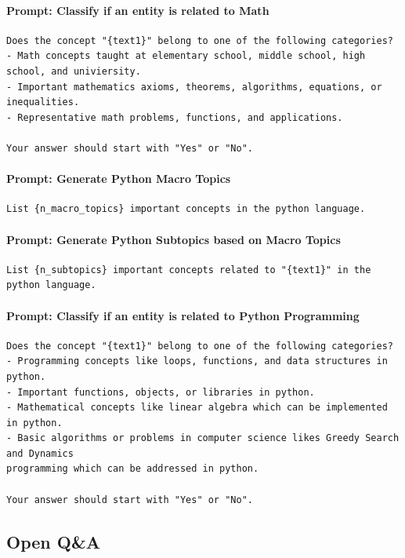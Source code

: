 \documentclass[11pt]{article}
\begin{document}
\paragraph{Prompt: Classify if an entity is related to Math}
\begin{verbatim}
Does the concept "{text1}" belong to one of the following categories?
- Math concepts taught at elementary school, middle school, high school, and univiersity.
- Important mathematics axioms, theorems, algorithms, equations, or inequalities.
- Representative math problems, functions, and applications.

Your answer should start with "Yes" or "No".
\end{verbatim}


\paragraph{Prompt: Generate Python Macro Topics}
\begin{verbatim}
List {n_macro_topics} important concepts in the python language.
\end{verbatim}

\paragraph{Prompt: Generate Python Subtopics based on Macro Topics}
\begin{verbatim}
List {n_subtopics} important concepts related to "{text1}" in the python language.
\end{verbatim}

\paragraph{Prompt: Classify if an entity is related to Python Programming}
\begin{verbatim}
Does the concept "{text1}" belong to one of the following categories?
- Programming concepts like loops, functions, and data structures in python.
- Important functions, objects, or libraries in python.
- Mathematical concepts like linear algebra which can be implemented in python.
- Basic algorithms or problems in computer science likes Greedy Search and Dynamics 
programming which can be addressed in python.

Your answer should start with "Yes" or "No".
\end{verbatim}


\subsection{Open Q\&A}
\end{document}
